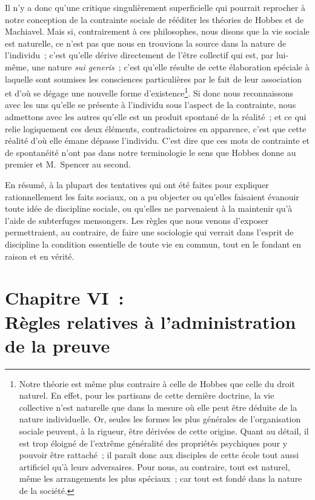 \documentclass[french,twoside]{book} %
\newcommand\chapteropen{} %
\newcommand\chapterclose{} %
\begin{document}
Il n’y a donc qu’une critique singulièrement superficielle qui pourrait reprocher à notre conception de la contrainte sociale de rééditer les théories de Hobbes et de Machiavel. Mais si, contrairement à ces philosophes, nous disons que la vie sociale est naturelle, ce n’est pas que nous en trouvions la source dans la nature de l’individu ; c’est qu’elle dérive directement de l’être collectif qui est, par lui-même, une nature {\itshape sui generis} ; c’est qu’elle résulte de cette élaboration spéciale à laquelle sont soumises les consciences particulières par le fait de leur association et d’où se dégage une nouvelle forme d’existence\footnote{ Notre théorie est même plus contraire à celle de Hobbes que celle du droit naturel. En effet, pour les partisans de cette dernière doctrine, la vie collective n’est naturelle que dans la mesure où elle peut être déduite de la nature individuelle. Or, seules les formes les plus générales de l’organisation sociale peuvent, à la rigueur, être dérivées de cette origine. Quant au détail, il est trop éloigné de l’extrême généralité des propriétés psychiques pour y pouvoir être rattaché ; il paraît donc aux disciples de cette école tout aussi artificiel qu’à leurs adversaires. Pour nous, au contraire, tout est naturel, même les arrangements les plus spéciaux ; car tout est fondé dans la nature de la société.}. Si donc nous reconnaissons avec les uns qu’elle se présente à l’individu sous l’aspect de la contrainte, nous admettons avec les autres qu’elle est un produit spontané de la réalité ; et ce qui relie logiquement ces deux éléments, contradictoires en apparence, c’est que cette réalité d’où elle émane dépasse l’individu. C’est dire que ces mots de contrainte et de spontanéité n’ont pas dans notre terminologie le sens que Hobbes donne au premier et M. Spencer au second.\par
En résumé, à la plupart des tentatives qui ont été faites pour expliquer rationnellement les faits sociaux, on a pu objecter ou qu’elles faisaient évanouir toute idée de discipline sociale, ou qu’elles ne parvenaient à la maintenir qu’à l’aide de subterfuges mensongers. Les règles que nous venons d’exposer permettraient, au contraire, de faire une sociologie qui verrait dans l’esprit de discipline la condition essentielle de toute vie en commun, tout en le fondant en raison et en vérité.
\chapterclose


\chapteropen
\chapter[{Chapitre VI : Règles relatives à l’administration de la preuve}]{Chapitre VI : \\
Règles relatives à l’administration de la preuve}\renewcommand{\leftmark}{Chapitre VI : \\
Règles relatives à l’administration de la preuve}
\end{document}
